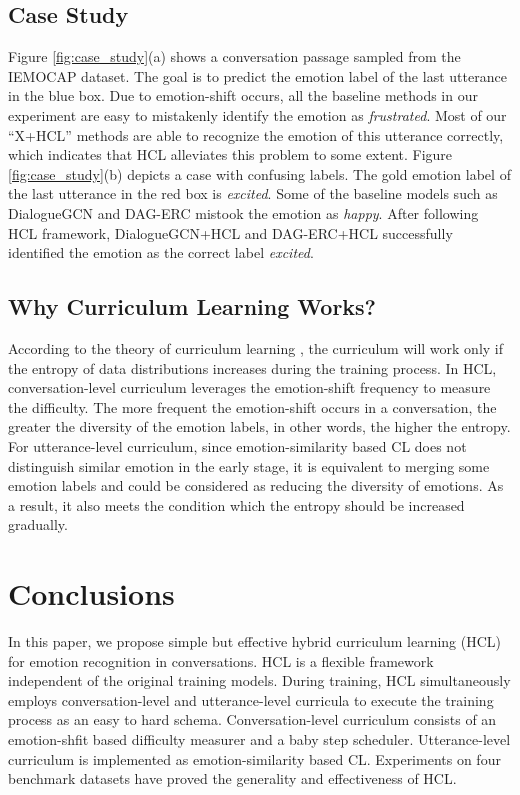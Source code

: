 \documentclass[letterpaper]{article} \usepackage{aaai22}  \usepackage{times}  \usepackage{helvet}  \usepackage{courier}  \usepackage[hyphens]{url}  \usepackage{graphicx} \urlstyle{rm} \def\UrlFont{\rm}  \usepackage{natbib}  \usepackage{caption} \DeclareCaptionStyle{ruled}{labelfont=normalfont,labelsep=colon,strut=off} \frenchspacing  \setlength{\pdfpagewidth}{8.5in}  \setlength{\pdfpageheight}{11in}
\begin{document}
\subsection{Case Study}

Figure \ref{fig:case_study}(a) shows a conversation passage sampled from the IEMOCAP dataset. The goal is to predict the emotion label of the last utterance in the blue box. Due to emotion-shift occurs, all the baseline methods in our experiment are easy to mistakenly identify the emotion as \emph{frustrated}. Most of our ``X+HCL'' methods are able to recognize the emotion of this utterance correctly, which indicates that HCL alleviates this problem to some extent.
Figure  \ref{fig:case_study}(b)  depicts a case with confusing labels. The gold emotion label of the last utterance in the red box is \emph{excited}. Some of the baseline models such as DialogueGCN and DAG-ERC mistook the emotion as \emph{happy}. After following HCL framework, DialogueGCN+HCL and DAG-ERC+HCL successfully identified the emotion as the correct label  \emph{excited}.


\subsection{Why Curriculum Learning Works?}

According to the theory of curriculum learning \cite{bengio2009curriculum}, the curriculum will work only if the entropy of data distributions increases during the training process. In HCL, conversation-level curriculum leverages the emotion-shift frequency to measure the difficulty. The more frequent the emotion-shift occurs in a conversation, the greater the diversity of the emotion labels, in other words, the higher the entropy. For utterance-level curriculum, since emotion-similarity based CL does not distinguish similar emotion in the early stage, it is equivalent to merging some emotion labels and could be considered as reducing the diversity of emotions. As a result, it also meets the condition which the entropy should be increased gradually.

\section{Conclusions}

In this paper, we propose simple but effective hybrid curriculum learning (HCL) for emotion recognition in conversations. HCL is a flexible framework independent of the original training models. During training, HCL simultaneously employs conversation-level and utterance-level curricula to execute the training process as an easy to hard schema. Conversation-level curriculum consists of an emotion-shfit based difficulty measurer and a baby step scheduler. Utterance-level curriculum is implemented as emotion-similarity based CL. Experiments on four benchmark datasets have proved the generality and effectiveness of HCL. 
\end{document}
